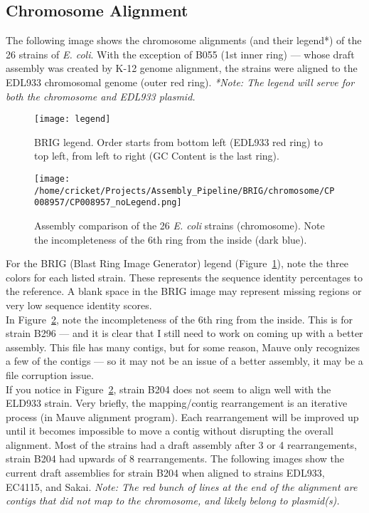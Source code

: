 \documentclass[11pt]{article}
\begin{document}
\subsection*{Chromosome Alignment}
The following image shows the chromosome alignments (and their legend*) of the 26 strains of \textit{E. coli}. With the exception of B055 (1st inner ring) --- whose draft assembly was created by K-12 genome alignment, the strains were aligned to the EDL933 chromosomal genome (outer red ring). \textit{*Note: The legend will serve for both the chromosome and EDL933 plasmid.}


\begin{figure}[h!]\normalsize %
\centering
\texttt{[image: legend]}
\caption{BRIG legend. Order starts from bottom left (EDL933 red ring) to top left, from left to right (GC Content is the last ring).}
\label{brig_legend}
\end{figure}

\clearpage

\begin{figure}[h!]\normalsize %
\centering
\texttt{[image: /home/cricket/Projects/Assembly\_Pipeline/BRIG/chromosome/CP008957/CP008957\_noLegend.png]}
\caption{Assembly comparison of the 26 \textit{E. coli} strains (chromosome). Note the incompleteness of the 6th ring from the inside (dark blue).}
\label{chromosomeAlignment}
\end{figure}
\clearpage

For the BRIG (Blast Ring Image Generator) legend (Figure~\ref{brig_legend}), note the three colors for each listed strain. These represents the sequence identity percentages to the reference. A blank space in the BRIG image may represent missing regions or very low sequence identity scores. \\

In Figure~\ref{chromosomeAlignment}, note the incompleteness of the 6th ring from the inside. This is for strain B296 --- and it is clear that I still need to work on coming up with a better assembly. This file has many contigs, but for some reason, Mauve only recognizes a few of the contigs --- so it may not be an issue of a better assembly, it may be a file corruption issue.  \\

If you notice in Figure~\ref{chromosomeAlignment}, strain B204 does not seem to align well with the ELD933 strain. Very briefly, the mapping/contig rearrangement is an iterative process (in Mauve alignment program). Each rearrangement will be improved up until it becomes impossible to move a contig without disrupting the overall alignment. Most of the strains had a draft assembly after 3 or 4 rearrangements, strain B204 had upwards of 8 rearrangements. The following images show the current draft assemblies for strain B204 when aligned to strains EDL933, EC4115, and Sakai. \textit{Note: The red bunch of lines at the end of the alignment are contigs that did not map to the chromosome, and likely belong to plasmid(s).}
\end{document}
